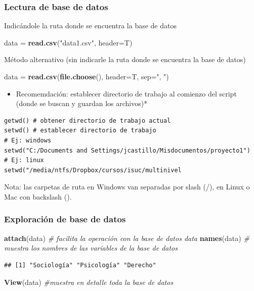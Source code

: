 \documentclass[]{article}
\newenvironment{Shaded}{\begin{snugshade}}{\end{snugshade}}
\newcommand{\CommentTok}[1]{\textcolor[rgb]{0.56,0.35,0.01}{\textit{#1}}}
\newcommand{\DataTypeTok}[1]{\textcolor[rgb]{0.13,0.29,0.53}{#1}}
\newcommand{\KeywordTok}[1]{\textcolor[rgb]{0.13,0.29,0.53}{\textbf{#1}}}
\newcommand{\NormalTok}[1]{#1}
\newcommand{\StringTok}[1]{\textcolor[rgb]{0.31,0.60,0.02}{#1}}
\providecommand{\tightlist}{%
  \setlength{\itemsep}{0pt}\setlength{\parskip}{0pt}}
\begin{document}
\hypertarget{lectura-de-base-de-datos}{%
\subsubsection{Lectura de base de
datos}\label{lectura-de-base-de-datos}}

Indicándole la ruta donde se encuentra la base de datos

\begin{Shaded}
\begin{Highlighting}[]
\NormalTok{data =}\StringTok{ }\KeywordTok{read.csv}\NormalTok{(}\StringTok{"data1.csv"}\NormalTok{, }\DataTypeTok{header=}\NormalTok{T)}
\end{Highlighting}
\end{Shaded}

Método alternativo (sin indicarle la ruta donde se encuentra la base de
datos)

\begin{Shaded}
\begin{Highlighting}[]
\NormalTok{data =}\StringTok{ }\KeywordTok{read.csv}\NormalTok{(}\KeywordTok{file.choose}\NormalTok{(), }\DataTypeTok{header=}\NormalTok{T, }\DataTypeTok{sep=}\StringTok{", "}\NormalTok{)}
\end{Highlighting}
\end{Shaded}

\begin{itemize}
\tightlist
\item
  Recomemdación: establecer directorio de trabajo al comienzo del script
  (donde se buscan y guardan los archivos)*
\end{itemize}

\begin{verbatim}
getwd() # obtener directorio de trabajo actual
setwd() # establecer directorio de trabajo
# Ej: windows
setwd("C:/Documents and Settings/jcastillo/Misdocumentos/proyecto1")
# Ej: linux
setwd("/media/ntfs/Dropbox/cursos/isuc/multinivel
\end{verbatim}

Nota: las carpetas de ruta en Windows van separadas por slash (/), en
Linux o Mac con backslash ().

\hypertarget{exploracion-de-base-de-datos}{%
\subsubsection{Exploración de base de
datos}\label{exploracion-de-base-de-datos}}

\begin{Shaded}
\begin{Highlighting}[]
\KeywordTok{attach}\NormalTok{(data) }\CommentTok{# facilita la operación con la base de datos data}
\KeywordTok{names}\NormalTok{(data) }\CommentTok{# muestra los nombres de las variables de la base de datos}
\end{Highlighting}
\end{Shaded}

\begin{verbatim}
## [1] "Sociología" "Psicología" "Derecho"
\end{verbatim}

\begin{Shaded}
\begin{Highlighting}[]
\KeywordTok{View}\NormalTok{(data)  }\CommentTok{#muestra en detalle toda la base de datos}
\end{Highlighting}
\end{Shaded}
\end{document}
